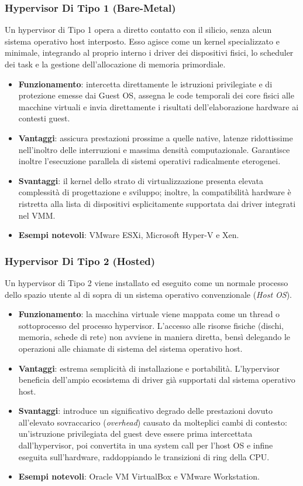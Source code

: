 \documentclass[11pt, a4paper]{article}
\begin{document}
\subsubsection{Hypervisor Di Tipo 1 (Bare-Metal)}
Un hypervisor di Tipo 1 opera a diretto contatto con il silicio, senza alcun sistema operativo host interposto. Esso agisce come un kernel specializzato e minimale, integrando al proprio interno i driver dei dispositivi fisici, lo scheduler dei task e la gestione dell'allocazione di memoria primordiale.
\begin{itemize}
    \item \textbf{Funzionamento}: intercetta direttamente le istruzioni privilegiate e di protezione emesse dai Guest OS, assegna le code temporali dei core fisici alle macchine virtuali e invia direttamente i risultati dell'elaborazione hardware ai contesti guest.
    \item \textbf{Vantaggi}: assicura prestazioni prossime a quelle native, latenze ridottissime nell'inoltro delle interruzioni e massima densità computazionale. Garantisce inoltre l'esecuzione parallela di sistemi operativi radicalmente eterogenei.
    \item \textbf{Svantaggi}: il kernel dello strato di virtualizzazione presenta elevata complessità di progettazione e sviluppo; inoltre, la compatibilità hardware è ristretta alla lista di dispositivi esplicitamente supportata dai driver integrati nel VMM.
    \item \textbf{Esempi notevoli}: VMware ESXi, Microsoft Hyper-V e Xen.
\end{itemize}

\subsubsection{Hypervisor Di Tipo 2 (Hosted)}
Un hypervisor di Tipo 2 viene installato ed eseguito come un normale processo dello spazio utente al di sopra di un sistema operativo convenzionale (\emph{Host OS}).
\begin{itemize}
    \item \textbf{Funzionamento}: la macchina virtuale viene mappata come un thread o sottoprocesso del processo hypervisor. L'accesso alle risorse fisiche (dischi, memoria, schede di rete) non avviene in maniera diretta, bensì delegando le operazioni alle chiamate di sistema del sistema operativo host.
    \item \textbf{Vantaggi}: estrema semplicità di installazione e portabilità. L'hypervisor beneficia dell'ampio ecosistema di driver già supportati dal sistema operativo host.
    \item \textbf{Svantaggi}: introduce un significativo degrado delle prestazioni dovuto all'elevato sovraccarico (\emph{overhead}) causato da molteplici cambi di contesto: un'istruzione privilegiata del guest deve essere prima intercettata dall'hypervisor, poi convertita in una system call per l'host OS e infine eseguita sull'hardware, raddoppiando le transizioni di ring della CPU.
    \item \textbf{Esempi notevoli}: Oracle VM VirtualBox e VMware Workstation.
\end{itemize}
\end{document}
